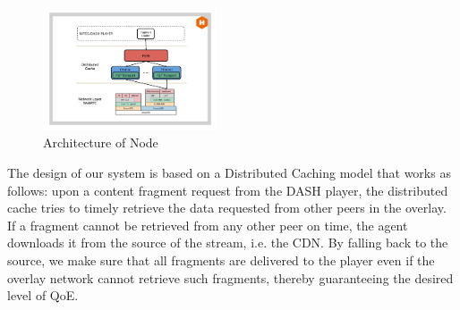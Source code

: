 \documentclass{sig-alternate}
\begin{document}


\begin{figure}[t]
  \centering
    \includegraphics[width=0.46\textwidth]{figs/architecture}
\vspace*{-0.38cm}
	\caption{Architecture of Node} \label{fig:architecture}
\vspace*{-0.4cm}
\end{figure}


\label{sec:architecture}

The design of our system is based on a Distributed Caching model that works as follows:
upon a content fragment request from the DASH player, the distributed cache tries to
timely retrieve the data requested from other peers in the overlay. If a fragment cannot
be retrieved from any other peer on time, the agent downloads it from the source of the
stream, i.e. the CDN. By falling back to the source, we make sure that all fragments are
delivered to the player even if the overlay network cannot retrieve such fragments,
thereby guaranteeing the desired level of QoE.
\end{document}
